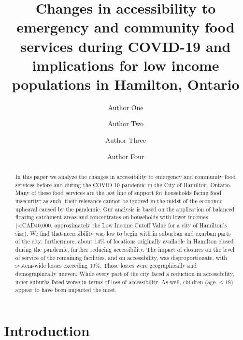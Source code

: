 \documentclass[]{elsarticle} %
\begin{document}
\begin{frontmatter}

  \title{Changes in accessibility to emergency and community food
services during COVID-19 and implications for low income populations in
Hamilton, Ontario}
    \author[Some University]{Author One}
    \author[Another University]{Author Two}
    \author[Some University]{Author Three}
    \author[Some University]{Author Four}
      \address[Some University]{Department, Street, City, State, Zip}
    \address[Another University]{Department, Street, City, State, Zip}
  
  \begin{abstract}
  In this paper we analyze the changes in accessibility to emergency and
  community food services before and during the COVID-19 pandemic in the
  City of Hamilton, Ontario. Many of these food services are the last
  line of support for households facing food insecurity; as such, their
  relevance cannot be ignored in the midst of the economic upheaval
  caused by the pandemic. Our analysis is based on the application of
  balanced floating catchment areas and concentrates on households with
  lower incomes (\textless CAD40,000, approximately the Low Income
  Cutoff Value for a city of Hamilton's size). We find that
  accessibility was low to begin with in suburban and exurban parts of
  the city; furthermore, about 14\% of locations originally available in
  Hamilton closed during the pandemic, further reducing accessibility.
  The impact of closures on the level of service of the remaining
  facilities, and on accessibility, was disproportionate, with
  system-wide losses exceeding 39\%. Those losses were geographically
  and demographically uneven. While every part of the city faced a
  reduction in accessibility, inner suburbs fared worse in terms of loss
  of accessibility. As well, children (age \(\le 18\)) appear to have
  been impacted the most.
  \end{abstract}
  
 \end{frontmatter}

\hypertarget{introduction}{%
\section{Introduction}\label{introduction}}
\end{document}
